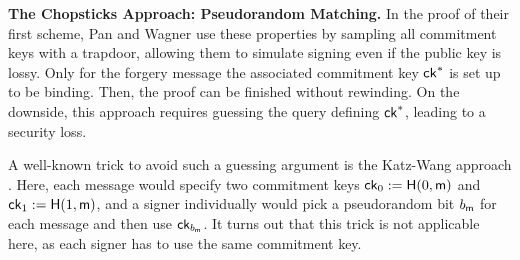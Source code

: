 \documentclass[version=final]{iacrcc}
\theoremstyle{mytheorem}				\newtheorem{theorem}{Theorem}
\theoremstyle{myplain}
\theoremstyle{mydefinition}
\theoremstyle{myremark}
\begin{document}
\smallskip\noindent\textbf{The Chopsticks Approach: Pseudorandom Matching.}
In the proof of their first scheme, Pan and Wagner \cite{EC:PanWag23} use these properties by sampling all commitment keys with a trapdoor, allowing them to simulate signing even if the public key is lossy.
Only for the forgery message the associated commitment key ${\mathsf{ck}}^*$ is set up to be binding. 
Then, the proof can be finished without rewinding.
On the downside, this approach requires guessing the query defining ${\mathsf{ck}}^*$, leading to a security loss. 

A well-known trick to avoid such a guessing argument is the Katz-Wang approach \cite{JC:GJKW07}.
Here, each message would specify two commitment keys ${\mathsf{ck}}_0 := \mathsf{H}(0,\mathsf{m})$ and ${\mathsf{ck}}_1 := \mathsf{H}(1,\mathsf{m})$, and a signer individually would pick a pseudorandom bit $b_{\mathsf{m}}$ for each message and then use ${\mathsf{ck}}_{b_{\mathsf{m}}}$.
It turns out that this trick is not applicable here, as each signer has to use the same commitment key.
\end{document}
